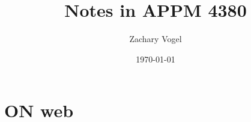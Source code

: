 \documentclass{article}
\author{Zachary Vogel}
\title{Notes in APPM 4380}
\date{\today}
\begin{document}
\maketitle
\section{ON web}
\end{document}
